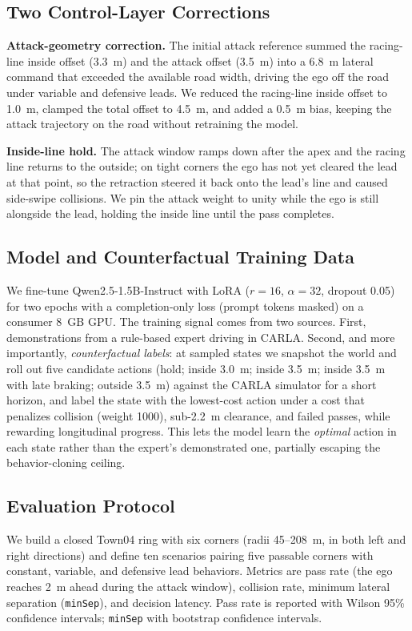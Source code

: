 \documentclass[conference]{IEEEtran}
\begin{document}
\subsection{Two Control-Layer Corrections}
\textbf{Attack-geometry correction.} The initial attack reference summed the
racing-line inside offset (3.3~m) and the attack offset (3.5~m) into a 6.8~m
lateral command that exceeded the available road width, driving the ego off the
road under variable and defensive leads. We reduced the racing-line inside
offset to 1.0~m, clamped the total offset to 4.5~m, and added a 0.5~m bias,
keeping the attack trajectory on the road without retraining the model.

\textbf{Inside-line hold.} The attack window ramps down after the apex and the
racing line returns to the outside; on tight corners the ego has not yet cleared
the lead at that point, so the retraction steered it back onto the lead's line
and caused side-swipe collisions. We pin the attack weight to unity while the
ego is still alongside the lead, holding the inside line until the pass
completes.

\subsection{Model and Counterfactual Training Data}
We fine-tune Qwen2.5-1.5B-Instruct with LoRA ($r{=}16$, $\alpha{=}32$, dropout
0.05) for two epochs with a completion-only loss (prompt tokens masked) on a
consumer 8~GB GPU. The training signal comes from two sources. First,
demonstrations from a rule-based expert driving in CARLA. Second, and more
importantly, \emph{counterfactual labels}: at sampled states we snapshot the
world and roll out five candidate actions (hold; inside 3.0~m; inside 3.5~m;
inside 3.5~m with late braking; outside 3.5~m) against the CARLA simulator for a
short horizon, and label the state with the lowest-cost action under a cost that
penalizes collision (weight 1000), sub-2.2~m clearance, and failed passes, while
rewarding longitudinal progress. This lets the model learn the \emph{optimal}
action in each state rather than the expert's demonstrated one, partially
escaping the behavior-cloning ceiling.

\subsection{Evaluation Protocol}
We build a closed Town04 ring with six corners (radii 45--208~m, in both left
and right directions) and define ten scenarios pairing five passable corners
with constant, variable, and defensive lead behaviors. Metrics are pass rate
(the ego reaches 2~m ahead during the attack window), collision rate, minimum
lateral separation (\texttt{minSep}), and decision latency. Pass rate is
reported with Wilson 95\% confidence intervals; \texttt{minSep} with bootstrap
confidence intervals.
\end{document}
